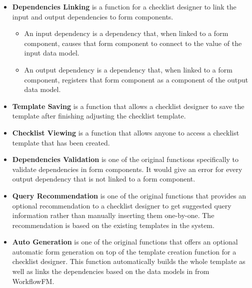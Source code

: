 \begin{itemize}
    \item \textbf{Dependencies Linking} is a function for a checklist designer to link the input and output dependencies to form components.
    \begin{itemize}
        \item An input dependency is a dependency that, when linked to a form component, causes that form component to connect to the value of the input data model.
        \item An output dependency is a dependency that, when linked to a form component, registers that form component as a component of the output data model.
    \end{itemize}
    \item \textbf{Template Saving} is a function that allows a checklist designer to save the template after finishing adjusting the checklist template.
    \item \textbf{Checklist Viewing} is a function that allows anyone to access a checklist template that has been created.
    \item \textbf{Dependencies Validation} is one of the original functions specifically to validate dependencies in form components. It would give an error for every output dependency that is not linked to a form component.
    \item \textbf{Query Recommendation} is one of the original functions that provides an optional recommendation to a checklist designer to get suggested query information rather than manually inserting them one-by-one. The recommendation is based on the existing templates in the system.
    \item \textbf{Auto Generation} is one of the original functions that offers an optional automatic form generation on top of the template creation function for a checklist designer. This function automatically builds the whole template as well as links the dependencies based on the data models in from WorkflowFM.
\end{itemize}

